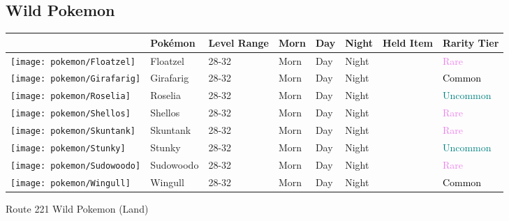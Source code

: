 \subsection{Wild Pokemon}%
\label{subsec:WildPokemon}%
\begin{longtable}{||l l l l l l l l||}%
\hline%
&Pokémon&Level Range&Morn&Day&Night&Held Item&Rarity Tier\\%
\hline%
\endhead%
\hline%
\texttt{[image: pokemon/Floatzel]}&Floatzel&28{-}32&Morn&Day&Night&&\textcolor{violet}{%
Rare%
}\\%
\hline%
\texttt{[image: pokemon/Girafarig]}&Girafarig&28{-}32&Morn&Day&Night&&\textcolor{black}{%
Common%
}\\%
\hline%
\texttt{[image: pokemon/Roselia]}&Roselia&28{-}32&Morn&Day&Night&&\textcolor{teal}{%
Uncommon%
}\\%
\hline%
\texttt{[image: pokemon/Shellos]}&Shellos&28{-}32&Morn&Day&Night&&\textcolor{violet}{%
Rare%
}\\%
\hline%
\texttt{[image: pokemon/Skuntank]}&Skuntank&28{-}32&Morn&Day&Night&&\textcolor{violet}{%
Rare%
}\\%
\hline%
\texttt{[image: pokemon/Stunky]}&Stunky&28{-}32&Morn&Day&Night&&\textcolor{teal}{%
Uncommon%
}\\%
\hline%
\texttt{[image: pokemon/Sudowoodo]}&Sudowoodo&28{-}32&Morn&Day&Night&&\textcolor{violet}{%
Rare%
}\\%
\hline%
\texttt{[image: pokemon/Wingull]}&Wingull&28{-}32&Morn&Day&Night&&\textcolor{black}{%
Common%
}\\%
\hline%
\end{longtable}%
\caption{Route 221 Wild Pokemon (Land)}%
